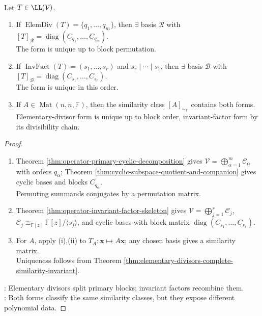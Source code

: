 \begin{theorem} \label{thm:rational-canonical-form-elementary-and-invariant-versions} \\
Let $T\in\LL(\mathcal{V})$.
\begin{enumerate}[label=(\roman*)]
\setlength{\itemsep}{0pt}
\item If $\operatorname{ElemDiv}(T)=\{q_1,\ldots,q_m\}$, then $\exists$ basis $\mathcal{R}$ with $[T]_{\mathcal{R}}=\operatorname{diag}(C_{q_1},\ldots,C_{q_m})$.\\
The form is unique up to block permutation.
\item If $\operatorname{InvFact}(T)=(s_1,\ldots,s_r)$ and $s_r\mid\cdots\mid s_1$, then $\exists$ basis $\mathcal{B}$ with $[T]_{\mathcal{B}}=\operatorname{diag}(C_{s_1},\ldots,C_{s_r})$.\\
The form is unique in this order.
\item If $A\in\operatorname{Mat}(n,n,\mathbb{F})$, then the similarity class $[A]_{\sim_{\mathbb{F}}}$ contains both forms.\\
Elementary-divisor form is unique up to block order, invariant-factor form by its divisibility chain.
\end{enumerate}
\begin{proof}
\begin{enumerate}[label=(\roman*)]
\setlength{\itemsep}{0pt}
\item Theorem \ref{thm:operator-primary-cyclic-decomposition} gives $\mathcal{V}=\bigoplus_{\alpha=1}^m\mathcal{C}_\alpha$ with orders $q_\alpha$; Theorem \ref{thm:cyclic-subspace-quotient-and-companion} gives cyclic bases and blocks $C_{q_\alpha}$.\\
Permuting summands conjugates by a permutation matrix. 
\item Theorem \ref{thm:operator-invariant-factor-skeleton} gives $\mathcal{V}=\bigoplus_{j=1}^r\mathcal{C}_j$, $\mathcal{C}_j\cong_{\mathbb{F}[z]}\mathbb{F}[z]/\langle s_j\rangle$, and cyclic bases with block matrix $\operatorname{diag}(C_{s_1},\ldots,C_{s_r})$.
\item For $A$, apply (i),(ii) to $T_A:\mathbf{x}\mapsto A\mathbf{x}$; any chosen basis gives a similarity matrix.\\
Uniqueness follows from Theorem \ref{thm:elementary-divisors-complete-similarity-invariant}.
\end{enumerate}
: Elementary divisors split primary blocks; invariant factors recombine them.\\
: Both forms classify the same similarity classes, but they expose different polynomial data.
\end{proof}
\end{theorem}

